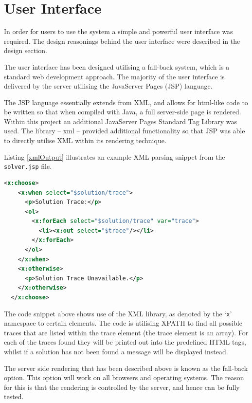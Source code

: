 \section{User Interface}
\label{sec:imp_user_interface}

In order for users to use the system a simple and powerful user interface was 
required. The design reasonings behind the user interface were described in 
the design section.

The user interface has been designed utilising a fall-back system, which is a 
standard web development approach. The majority of the user interface is 
delivered by the server utilising the JavaServer Pages (JSP) language.

The JSP language essentially extends from XML, and allows for html-like code to 
be written so that when compiled with Java, a full server-side page is rendered.
Within this project an additional JavaServer Pages Standard Tag Library was 
used. The library -- xml -- provided additional functionality so that JSP was 
able to directly utilise XML within its rendering technique.

Listing \ref{xmlOutput} illustrates an example XML parsing snippet from the 
\texttt{solver.jsp} file.

\begin{lstlisting}[language=XML, 
                   caption={isPatternValid deduces if a given solution pattern 
                            is valid}, 
                   label=xmlOutput] 
  <x:choose>
    <x:when select="$solution/trace">
      <p>Solution Trace:</p>
      <ol>
        <x:forEach select="$solution/trace" var="trace">
          <li><x:out select="$trace"/></li>
        </x:forEach>
      </ol>
    </x:when>
    <x:otherwise>
      <p>Solution Trace Unavailable.</p>
    </x:otherwise>
  </x:choose>
\end{lstlisting}

The code snippet above shows use of the XML library, as denoted by the
`\texttt{x}' namespace to certain elements. The code is utilising XPATH to find
all possible traces that are listed within the trace element (the trace element
is an array). For each of the traces found they will be printed out into the
predefined HTML tags, whilst if a solution has not been found a message will be
displayed instead.

The server side rendering that has been described above is known as the 
fall-back option. This option will work on all browsers and operating systems. 
The reason for this is that the rendering is controlled by the server, and hence
can be fully tested.

